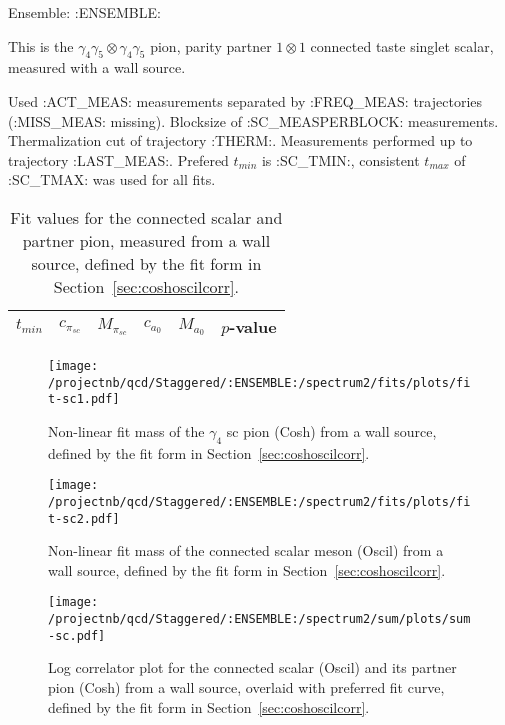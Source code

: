 Ensemble: :ENSEMBLE:

This is the $\gamma_4 \gamma_5 \otimes \gamma_4 \gamma_5$ pion, parity partner $1 \otimes 1$ connected taste singlet scalar, measured with a wall source. 

{\small{Used :ACT_MEAS: measurements separated by :FREQ_MEAS: trajectories (:MISS_MEAS: missing). Blocksize of :SC_MEASPERBLOCK: measurements. Thermalization cut of trajectory :THERM:. Measurements performed up to trajectory :LAST_MEAS:. Prefered $t_{min}$ is :SC_TMIN:, consistent $t_{max}$ of :SC_TMAX: was used for all fits.}}

\begin{table}[ht!]
\centering
\scriptsize
\begin{tabular}{|c|c|c|c|c|c|}
\hline
 $t_{min}$ & $c_{\pi_{sc}}$ &  $M_{\pi_{sc}}$ & $c_{a_0}$ & $M_{a_0}$ & $p$-value \\
\hline

\end{tabular}
\caption{Fit values for the connected scalar and partner pion, measured from a wall source, defined by the fit form in Section~\ref{sec:coshoscilcorr}.}
\end{table}


\begin{multicols}{2}
\begin{figure}[H]
\centering
\texttt{[image: /projectnb/qcd/Staggered/:ENSEMBLE:/spectrum2/fits/plots/fit-sc1.pdf]}
\caption{Non-linear fit mass of the $\gamma_4$ sc pion (Cosh) from a wall source, defined by the fit form in Section~\ref{sec:coshoscilcorr}.}
\end{figure}
\columnbreak
\begin{figure}[H]
\centering
\texttt{[image: /projectnb/qcd/Staggered/:ENSEMBLE:/spectrum2/fits/plots/fit-sc2.pdf]}
\caption{Non-linear fit mass of the connected scalar meson (Oscil) from a wall source, defined by the fit form in Section~\ref{sec:coshoscilcorr}.}
\end{figure}
\end{multicols}

\begin{figure}[H]
\centering
\texttt{[image: /projectnb/qcd/Staggered/:ENSEMBLE:/spectrum2/sum/plots/sum-sc.pdf]}
\caption{Log correlator plot for the connected scalar (Oscil) and its partner pion (Cosh) from a wall source, overlaid with preferred fit curve, defined by the fit form in Section~\ref{sec:coshoscilcorr}.}
\end{figure}

